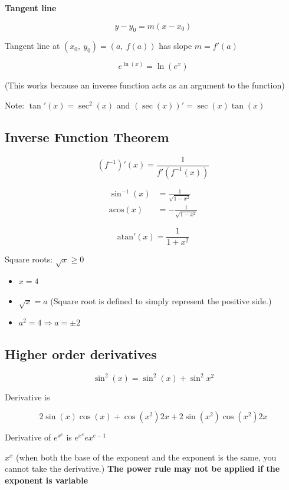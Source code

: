 \documentclass[
]{article}
\begin{document}
\textbf{Tangent line}

$$y - y_{0} = m\left( x - x_{0} \right)$$

Tangent line at
$\left( x_{0},\ y_{0} \right) = \left( a,\ f(a) \right)$ has slope
$m = f'(a)$

$$e^{\ln(x)} = \ln\left( e^{x} \right)$$

(This works because an inverse function acts as an argument to the
function)

Note: $\tan'(x) = \sec^{2}(x)$ and
$\left( \sec(x) \right)' = \sec(x)\tan(x)$


\subsection{Inverse Function Theorem}

$$\left( f^{- 1} \right)'(x) = \frac{1}{f'\left( f^{- 1}(x) \right)}$$

\begin{align*}
\sin^{- 1}{(x)} &= \frac{1}{\sqrt{1 - x^{2}}}
 \\
\text{acos}(x) &= - \frac{1}{\sqrt{1 - x^{2}}}
\end{align*}


$$\text{atan}'(x) = \frac{1}{1 + x^{2}}$$

Square roots: $\sqrt{x} \geq 0$

\begin{itemize}
\item
  $x = 4$
\item
  $\sqrt{x} = a$ (Square root is defined to simply represent the
  positive side.)
\item
  $a^{2} = 4 \Rightarrow a = \pm 2$
\end{itemize}


\subsection{Higher order derivatives}

$$\sin^{2}{(x)} = \sin^{2}(x) + \sin^{2}x^{2}$$

Derivative is

$$2\sin(x)\cos(x) + \cos\left( x^{2} \right)2x + 2\sin\left( x^{2} \right)\cos\left( x^{2} \right)2x$$

Derivative of $e^{x^{e}}$ is $e^{x^{e}}ex^{e - 1}$

$x^{x}$ (when both the base of the exponent and the exponent is the
same, you cannot take the derivative.) \textbf{The power rule may not be
applied if the exponent is variable}
\end{document}

